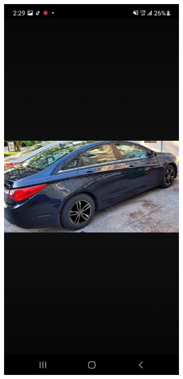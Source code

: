 \documentclass[12pt]{article}
\begin{document}
\begin{figure}[!ht]
    \centering
    \begin{subfigure}[b]{0.3\textwidth}
        \centering
        \includegraphics[width=\textwidth]{images/car1.png}

\end{subfigure}
\end{figure}
\end{document}
